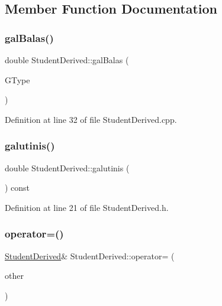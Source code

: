 \subsection{Member Function Documentation}
\mbox{\label{class_student_derived_a93af5f3ffa604f0b9481fcaaeac238a0}} 
\subsubsection{\texorpdfstring{galBalas()}{galBalas()}}
{\footnotesize\ttfamily double Student\+Derived\+::gal\+Balas (\begin{DoxyParamCaption}\item[{const string \&}]{G\+Type }\end{DoxyParamCaption})}



Definition at line 32 of file Student\+Derived.\+cpp.

\mbox{\label{class_student_derived_a44e33a50e90bd21a1b161d67277789f3}} 
\subsubsection{\texorpdfstring{galutinis()}{galutinis()}}
{\footnotesize\ttfamily double Student\+Derived\+::galutinis (\begin{DoxyParamCaption}{ }\end{DoxyParamCaption}) const\hspace{0.3cm}{\ttfamily [inline]}}



Definition at line 21 of file Student\+Derived.\+h.

\mbox{\label{class_student_derived_aec705037a02dabdf675f62420d5fd611}} 
\subsubsection{\texorpdfstring{operator=()}{operator=()}}
{\footnotesize\ttfamily \mbox{\hyperlink{class_student_derived}{Student\+Derived}}\& Student\+Derived\+::operator= (\begin{DoxyParamCaption}\item[{const \mbox{\hyperlink{class_student_derived}{Student\+Derived}} \&}]{other }\end{DoxyParamCaption})\hspace{0.3cm}{\ttfamily [inline]}}



